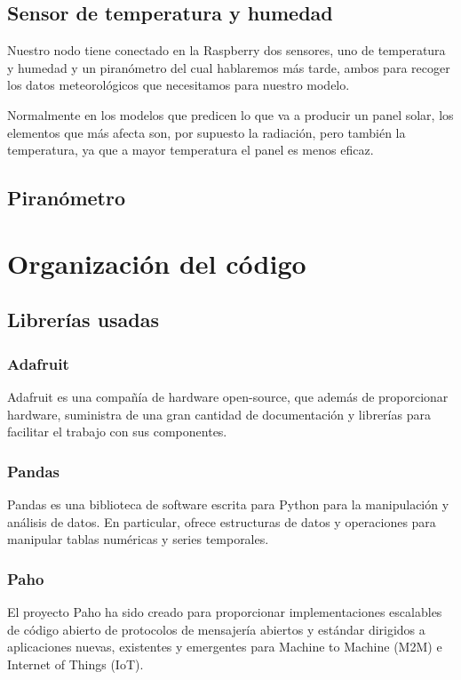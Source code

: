 \subsection{Sensor de temperatura y humedad}

Nuestro nodo tiene conectado en la Raspberry dos sensores, uno de temperatura y humedad y un piranómetro del cual hablaremos más tarde, ambos para recoger los datos meteorológicos que necesitamos para nuestro modelo.

Normalmente en los modelos que predicen lo que va a producir un panel solar, los elementos que más afecta son, por supuesto la radiación, pero también la temperatura, ya que a mayor temperatura el panel es menos eficaz. 


\subsection{Piranómetro}


\section{Organización del código}
\label{makereference4.3} 
	\subsection{Librerías usadas}
		\subsubsection{Adafruit}
		Adafruit es una compañía de hardware open-source, que además de proporcionar hardware, suministra de una gran cantidad de documentación y librerías para facilitar el trabajo con sus componentes.
		
		\subsubsection{Pandas}
		Pandas es una biblioteca de software escrita para Python para la manipulación y análisis de datos. En particular, ofrece estructuras de datos y operaciones para manipular tablas numéricas y series temporales.
		
		\subsubsection{Paho}
		El proyecto Paho ha sido creado para proporcionar implementaciones escalables de código abierto de protocolos de mensajería abiertos y estándar dirigidos a aplicaciones nuevas, existentes y emergentes para Machine to Machine (M2M) e Internet of Things (IoT).
		
